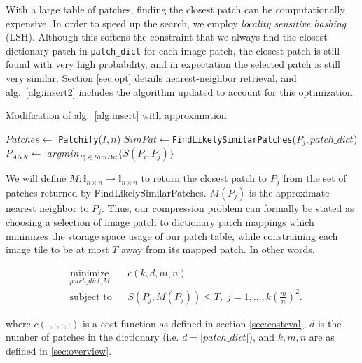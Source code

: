 With a large table of patches, finding the closest patch can be computationally expensive.  In order to speed up the search, we employ \emph{locality sensitive hashing} (LSH).  Although this softens the constraint that we always find the closest dictionary patch in \texttt{patch\_dict} for each image patch, the closest patch is still found with very high probability, and in expectation the selected patch is still very similar.  Section \ref{sec:opt} details nearest-neighbor retrieval, and alg.~\ref{alg:insert2} includes the algorithm updated to account for this optimization.
\begin{algorithm}
    \caption{Modification of alg.~\ref{alg:insert} with approximation}
    \label{alg:insert2}
\begin{algorithmic}[1]
\State $Patches \leftarrow $ \texttt{Patchify}($I,n$)
\State $SimPat \leftarrow $\texttt{FindLikelySimilarPatches}($P_j,patch\_dict$)
\State $P_{ANN} \leftarrow $ $argmin_{P_i \in SimPat} \{ S(P_i, P_j) \}$
\EndIf
\EndFor
\vspace{3mm}
\end{algorithmic}
\end{algorithm}

We will define $M \colon \mathds{I}_{n \times n}  \to \mathds{I}_{n \times n}$ to return the closest patch to $P_j$ from the set of patches returned by FindLikelySimilarPatches. $M(P_j)$ is the approximate nearest neighbor to $P_j$.
Thus, our compression problem can formally be stated as choosing a selection of image patch to dictionary patch mappings which minimizes the storage space usage of our patch table, while constraining each image tile to be at most $T$ away from its mapped patch.  In other words,

\begin{equation*}
\begin{aligned}
& \underset{patch\_dict, M}{\text{minimize}}
& & c(k, d, m, n) \\
& \text{subject to}
& & S(P_j, M(P_j)) \leq T, \; j = 1, \ldots, k\left(\frac{m}{n}\right)^2.
\end{aligned}
\end{equation*}

where $c(\cdot, \cdot, \cdot, \cdot)$ is a cost function as defined in section \ref{sec:costeval}, $d$ is the number of patches in the dictionary (i.e. $d = |patch\_dict|$), and $k,m,n$ are as defined in \ref{sec:overview}.

